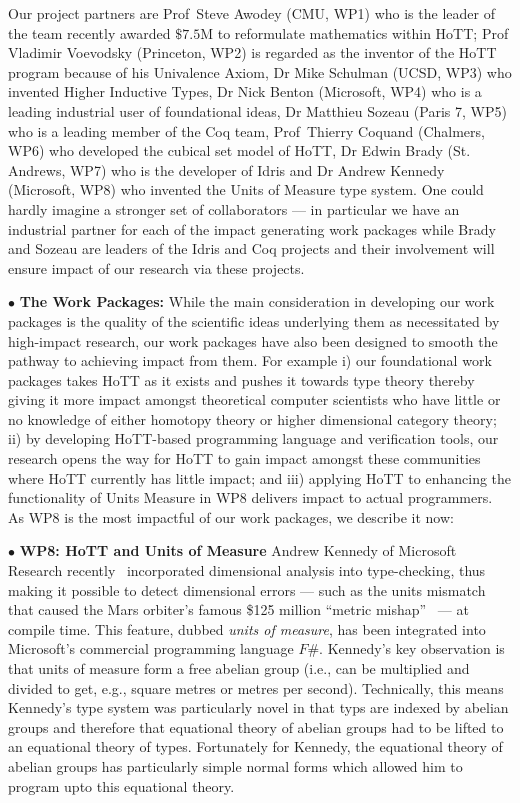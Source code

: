 \documentclass[a4paper,11pt]{article}
\begin{document}
Our project partners are Prof~Steve Awodey (CMU, WP1) who is the
leader of the team recently awarded $\$7.5$M to reformulate mathematics
within HoTT; Prof Vladimir Voevodsky (Princeton, WP2) is regarded as
the inventor of the HoTT program because of his Univalence Axiom, Dr
Mike Schulman (UCSD, WP3) who invented Higher Inductive Types, Dr Nick
Benton (Microsoft, WP4) who is a leading industrial user of
foundational ideas, Dr Matthieu Sozeau (Paris 7, WP5) who is a leading
member of the Coq team, Prof~Thierry Coquand (Chalmers, WP6)
who developed the cubical set model of HoTT, Dr Edwin Brady (St. Andrews,
WP7) who is the developer of Idris and Dr Andrew Kennedy (Microsoft,
WP8) who invented the Units of Measure type system. One could hardly imagine a
stronger set of collaborators --- in particular we have 
an industrial partner for each of the impact generating
work packages while Brady and Sozeau are leaders of the Idris and Coq
projects and their involvement will ensure impact of our research via
these projects. 

\vspace*{0.02in}

$\bullet$ {\bf The Work Packages:} While the main consideration in
developing our work packages is the quality of the scientific ideas
underlying them as necessitated by high-impact research, our work
packages have also been designed to smooth the pathway to achieving
impact from them. For example i) our foundational work packages takes
HoTT as it exists and pushes it towards type theory thereby giving it 
more impact amongst  theoretical computer scientists who have little or
no knowledge of either homotopy theory or higher dimensional category
theory; ii) by developing HoTT-based programming language and
verification tools, our research opens the way for HoTT to gain impact
amongst these communities where HoTT currently has little impact; and 
iii) applying HoTT to enhancing the functionality of Units Measure
in WP8 delivers impact to actual programmers. As WP8 is the most
impactful of our work packages, we describe it now:

\vspace*{0.02in}

$\bullet$ {\bf WP8: HoTT and Units of Measure} Andrew Kennedy of
Microsoft Research recently~\cite{aknn97} incorporated dimensional
analysis into type-checking, thus making it possible to detect
dimensional errors --- such as the units mismatch that caused the Mars
orbiter's famous \$125 million ``metric mishap''~\cite{wp99} --- at
compile time. This feature, dubbed {\em units of measure}, has been
integrated into Microsoft's commercial programming language $F\#$.
Kennedy's key observation is that units of measure form a free abelian
group (i.e., can be multiplied and divided to get, e.g., square metres
or metres per second). Technically, this means Kennedy's type system
was particularly novel in that typs are indexed by abelian groups and
therefore that equational theory of abelian groups
had to be lifted to an equational theory of types. Fortunately for
Kennedy, the equational theory of abelian groups has particularly
simple normal forms which allowed him to program upto this equational
theory.
\end{document}

